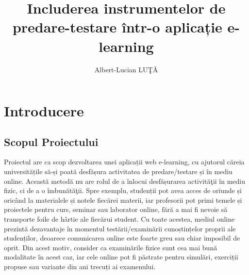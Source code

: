 \documentclass[12pt, a4paper, oneside, romanian]{teza-upb}
\begin{document}
\author{Albert-Lucian LUŢĂ}

\title{Includerea instrumentelor de predare-testare într-o aplicație e-learning}



\beforepreface
\newpage
\listoffigures
{}
\afterpreface 

\chapter*{Introducere}

\section{Scopul Proiectului}

Proiectul are ca scop dezvoltarea unei aplicații web e-learning, cu ajutorul căreia universitățile să-și poată desfășura activitatea de predare/testare și în mediu online. Această metodă nu are rolul de a înlocui desfășurarea activităţii în mediu fizic, ci de a o îmbunătăţii. Spre exemplu, studenții pot avea acces de oriunde și oricând la materialele și notele fiecărei materii, iar profesorii pot primi temele și proiectele pentru curs, seminar sau laborator online, fără a  mai fi nevoie să transporte foile de hârtie ale fiecărui student. Cu toate acestea, mediul online prezintă dezavantaje în momentul testării/examinării cunoștințelor proprii ale studenților, deoarece comunicarea online este foarte greu sau chiar imposibil de oprit. Din acest motiv, consider ca examinările fizice sunt cea mai bună modalitate în acest caz, iar cele online pot fi păstrate pentru simulări, exerciții propuse sau variante din ani trecuți ai examenului.
\end{document}
